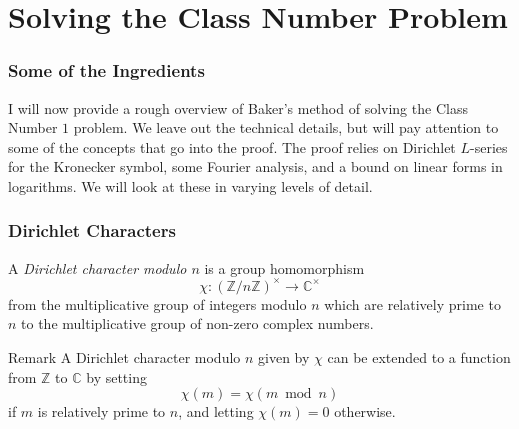 \documentclass[handout]{beamer}
\begin{document}
\section{Solving the Class Number Problem}

\begin{frame}

	\frametitle{Some of the Ingredients}

	I will now provide a rough overview of Baker's method of solving the Class Number $1$ problem. We leave out the technical details, but will pay attention to some of the concepts that go into the proof. The proof relies on Dirichlet $L$-series for the Kronecker symbol, some Fourier analysis, and a bound on linear forms in logarithms. We will look at these in varying levels of detail.

\end{frame}

\begin{frame}

	\frametitle{Dirichlet Characters}

	\begin{definition}
		A \emph{Dirichlet character modulo $n$} is a group homomorphism
		\[
			\chi : {\left(\mathbb{Z} / n \mathbb{Z}\right)}^\times \to {\mathbb{C}}^\times
		\]
		from the multiplicative group of integers modulo $n$ which are relatively prime to $n$ to the multiplicative group of non-zero complex numbers.
	\end{definition}

	\begin{block}{Remark}
		A Dirichlet character modulo $n$ given by $\chi$ can be extended to a function from $\mathbb{Z}$ to $\mathbb{C}$ by setting
		\[
			\chi(m) = \chi(m \bmod n)
		\]
		if $m$ is relatively prime to $n$, and letting $\chi(m) = 0$ otherwise.
	\end{block}

\end{frame}
\end{document}
